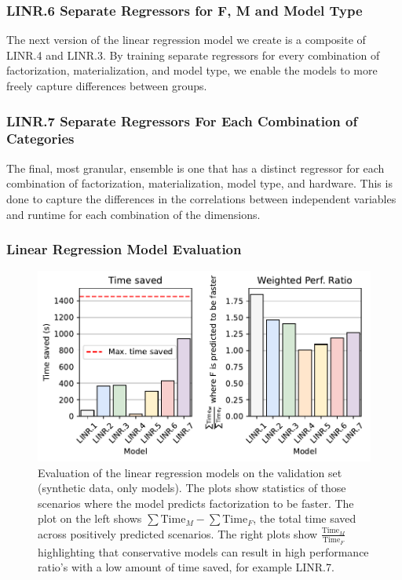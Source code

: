 \subsubsection*{LINR.6 Separate Regressors for F, M and Model Type}
The next version of the linear regression model we create is a composite of LINR.4 and LINR.3. By training separate regressors for every combination of factorization, materialization, and model type, we enable the models to more freely capture differences between groups.

\subsubsection*{LINR.7 Separate Regressors For Each Combination of Categories}
The final, most granular, ensemble is one that has a distinct regressor for each combination of factorization, materialization, model type, and hardware. This is done to capture the differences in the correlations between independent variables and runtime for each combination of the dimensions.


\subsubsection{Linear Regression Model Evaluation}
\begin{figure}[ht]
  \centering
  \includegraphics[width=0.75\linewidth]{chapters/05_cost_estimation/figures/stat-models-compare.pdf}
  \caption[Linear Regression Model Evaluation]{Evaluation of the linear regression models on the validation set (synthetic data, only models). The plots show statistics of those scenarios where the model predicts factorization to be faster. The plot on the left shows $\sum \text{Time}_M - \sum \text{Time}_F$, the total time saved across positively predicted scenarios. The right plots show $\frac{\text{Time}_M}{\text{Time}_F}$ highlighting that conservative models can result in high performance ratio's with a low amount of time saved, for example LINR.7.}
  \label{fig:5-linear-regression-model-evaluation}
\end{figure}

